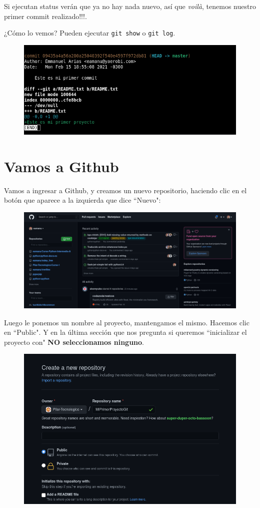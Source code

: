 \documentclass[a4paper]{article}
\begin{document}
Si ejecutan status verán que ya no hay nada nuevo, así que \textit{voilà},
tenemos nuestro primer commit realizado!!!.

¿Cómo lo vemos? Pueden ejecutar \verb|git show| o \verb|git log|.

\begin{figure}[H]
	\centering
	\includegraphics[width=0.7\linewidth]{img/miprimerproyecto7}
	\label{fig:miprimerproyecto7}
\end{figure}


\section{Vamos a Github}

Vamos a ingresar a Github, y creamos un nuevo repositorio, haciendo clic
en el botón que aparece a la izquierda que dice ``Nuevo":

\begin{figure}[H]
	\centering
	\includegraphics[width=0.7\linewidth]{img/miprimerproyecto8}
	\label{fig:miprimerproyecto8}
\end{figure}

Luego le ponemos un nombre al proyecto, mantengamos el mismo. Hacemos
clic en ``Public". Y en la última sección que nos pregunta si queremos
``inicializar el proyecto con" \textbf{NO seleccionamos ninguno}.

\begin{figure}[H]
	\centering
	\includegraphics[width=0.7\linewidth]{img/miprimerproyecto9}
	\label{fig:miprimerproyecto9}
\end{figure}
\end{document}
